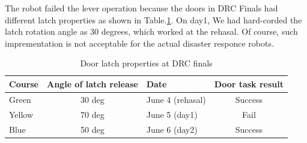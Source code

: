 The robot failed the lever operation because the doors in DRC Finals had different latch properties
as shown in Table.\ref{tbl:door_latch}. On day1, We had hard-corded the latch rotation angle as 30 degrees,
which worked at the rehasal. Of course, such imprementation is not acceptable 
for the actual disaster responce robots.
%
\begin{table}[htb]
\caption{Door latch properties at DRC finals} \label{tbl:door_latch}
\begin{tabular}{lclc}
\hline
Course & Angle of latch release & Date & Door task result  \\ 
\hline
Green & 30 deg & June 4 (rehasal) & Success  \\
Yellow & 70 deg & June 5 (day1) & Fail \\
Blue &  50 deg & June 6 (day2)  & Success \\
\hline
\end{tabular}
\end{table}

